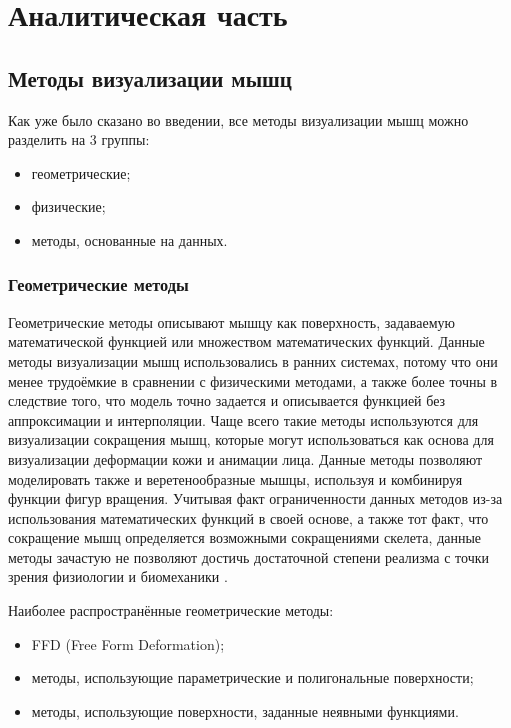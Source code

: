 \chapter{Аналитическая часть}

\section{Методы визуализации мышц}

Как уже было сказано во введении, все методы визуализации мышц можно разделить на 3 группы:
\begin{itemize}
    \item геометрические;
    \item физические;
    \item методы, основанные на данных.
\end{itemize}

\subsection{Геометрические методы}

Геометрические методы описывают мышцу как поверхность, задаваемую математической функцией или множеством математических функций. Данные методы визуализации мышц использовались в ранних системах, потому что они менее трудоёмкие в сравнении с физическими методами, а также более точны в следствие того, что модель точно задается и описывается функцией без аппроксимации и интерполяции\cite{cgv}. Чаще всего такие методы используются для визуализации сокращения мышц, которые могут использоваться как основа для визуализации деформации кожи и анимации лица. Данные методы позволяют моделировать также и веретенообразные мышцы, используя и комбинируя функции фигур вращения. Учитывая факт ограниченности данных методов из-за использования математических функций в своей основе, а также тот факт, что сокращение мышц определяется возможными сокращениями скелета, данные методы зачастую не позволяют достичь достаточной степени реализма с точки зрения физиологии и биомеханики \cite{bio}.

Наиболее распространённые геометрические методы:
\begin{itemize}
    \item FFD (Free Form Deformation)\cite{ffd};
    \item методы, использующие параметрические и полигональные поверхности\cite{pps};
    \item методы, использующие поверхности, заданные неявными функциями\cite{is1}\cite{is2}.
\end{itemize}

